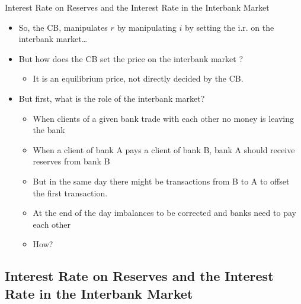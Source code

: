 \documentclass[
  ignorenonframetext,
  aspectratio=169,
]{beamer}
\providecommand{\tightlist}{%
  \setlength{\itemsep}{0pt}\setlength{\parskip}{0pt}}\usepackage{longtable,booktabs,array}
\begin{document}
\begin{frame}{Interest Rate on Reserves and the Interest Rate in the
Interbank Market}
\begin{itemize}
\item
  So, the CB, manipulates \(r\) by manipulating \(i\) by setting the
  i.r. on the interbank market\ldots{}
\item
  But how does the CB set the price on the interbank market ? 🤔

  \begin{itemize}
  \tightlist
  \item
    It is an equilibrium price, not directly decided by the CB.
  \end{itemize}
\item
  But first, what is the role of the interbank market?

  \begin{itemize}
  \tightlist
  \item
    When clients of a given bank trade with each other no money is
    leaving the bank
  \item
    When a client of bank A pays a client of bank B, bank A should
    receive reserves from bank B
  \item
    But in the same day there might be transactions from B to A to
    offset the first transaction.
  \item
    At the end of the day imbalances to be corrected and banks need to
    pay each other
  \item
    How?
  \end{itemize}
\end{itemize}
\end{frame}

\subsection{Interest Rate on Reserves and the Interest Rate in the
Interbank
Market}\label{interest-rate-on-reserves-and-the-interest-rate-in-the-interbank-market-1}
\end{document}

